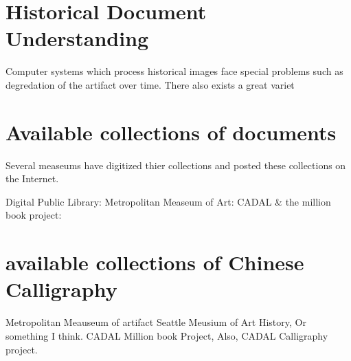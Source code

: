 \section{Historical Document Understanding}

Computer systems which process historical images face special problems such as degredation of the artifact over time.  There also exists a great variet


\section{Available collections of documents}

Several measeums have digitized thier collections and posted these collections on the Internet.

Digital Public Library:
Metropolitan Measeum of Art:
CADAL & the million book project:

\section{available collections of Chinese Calligraphy}

Metropolitan Meauseum of artifact
Seattle Meusium of Art History, Or something I think.
CADAL Million book Project,
Also, CADAL Calligraphy project.



